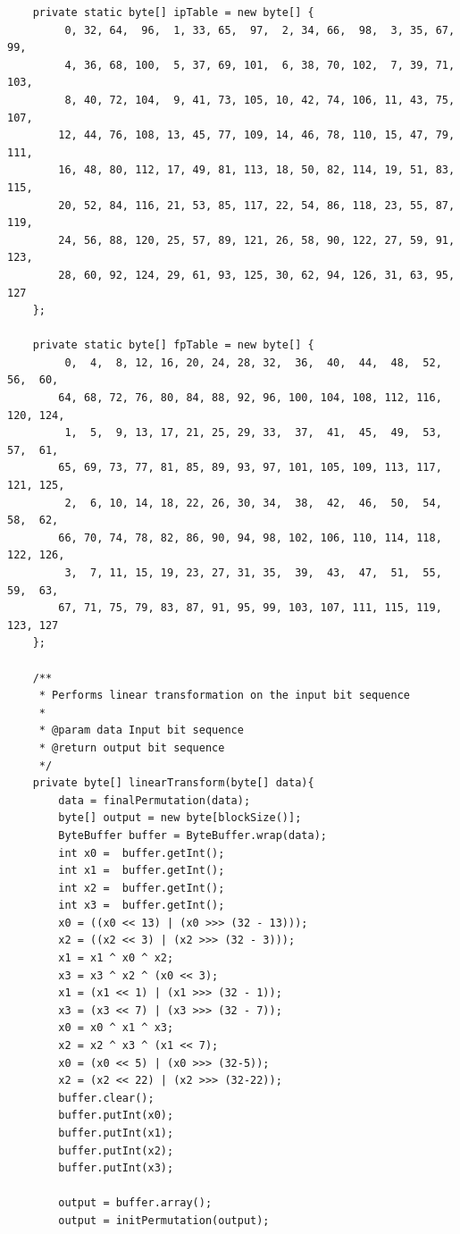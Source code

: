 \documentclass[12pt]{article} %
\begin{document}
\begin{lstlisting}
    private static byte[] ipTable = new byte[] {
         0, 32, 64,  96,  1, 33, 65,  97,  2, 34, 66,  98,  3, 35, 67,  99,
         4, 36, 68, 100,  5, 37, 69, 101,  6, 38, 70, 102,  7, 39, 71, 103,
         8, 40, 72, 104,  9, 41, 73, 105, 10, 42, 74, 106, 11, 43, 75, 107,
        12, 44, 76, 108, 13, 45, 77, 109, 14, 46, 78, 110, 15, 47, 79, 111,
        16, 48, 80, 112, 17, 49, 81, 113, 18, 50, 82, 114, 19, 51, 83, 115,
        20, 52, 84, 116, 21, 53, 85, 117, 22, 54, 86, 118, 23, 55, 87, 119,
        24, 56, 88, 120, 25, 57, 89, 121, 26, 58, 90, 122, 27, 59, 91, 123,
        28, 60, 92, 124, 29, 61, 93, 125, 30, 62, 94, 126, 31, 63, 95, 127
    };

    private static byte[] fpTable = new byte[] {
         0,  4,  8, 12, 16, 20, 24, 28, 32,  36,  40,  44,  48,  52,  56,  60,
        64, 68, 72, 76, 80, 84, 88, 92, 96, 100, 104, 108, 112, 116, 120, 124,
         1,  5,  9, 13, 17, 21, 25, 29, 33,  37,  41,  45,  49,  53,  57,  61,
        65, 69, 73, 77, 81, 85, 89, 93, 97, 101, 105, 109, 113, 117, 121, 125,
         2,  6, 10, 14, 18, 22, 26, 30, 34,  38,  42,  46,  50,  54,  58,  62,
        66, 70, 74, 78, 82, 86, 90, 94, 98, 102, 106, 110, 114, 118, 122, 126,
         3,  7, 11, 15, 19, 23, 27, 31, 35,  39,  43,  47,  51,  55,  59,  63,
        67, 71, 75, 79, 83, 87, 91, 95, 99, 103, 107, 111, 115, 119, 123, 127
    };
    
    /**
     * Performs linear transformation on the input bit sequence
     * 
     * @param data Input bit sequence
     * @return output bit sequence
     */
    private byte[] linearTransform(byte[] data){
        data = finalPermutation(data);
        byte[] output = new byte[blockSize()];
        ByteBuffer buffer = ByteBuffer.wrap(data);
        int x0 =  buffer.getInt();
        int x1 =  buffer.getInt();
        int x2 =  buffer.getInt();
        int x3 =  buffer.getInt();
        x0 = ((x0 << 13) | (x0 >>> (32 - 13))); 
        x2 = ((x2 << 3) | (x2 >>> (32 - 3)));
        x1 = x1 ^ x0 ^ x2;
        x3 = x3 ^ x2 ^ (x0 << 3);
        x1 = (x1 << 1) | (x1 >>> (32 - 1));
        x3 = (x3 << 7) | (x3 >>> (32 - 7));
        x0 = x0 ^ x1 ^ x3;
        x2 = x2 ^ x3 ^ (x1 << 7);
        x0 = (x0 << 5) | (x0 >>> (32-5));
        x2 = (x2 << 22) | (x2 >>> (32-22));
        buffer.clear();
        buffer.putInt(x0);
        buffer.putInt(x1);
        buffer.putInt(x2);
        buffer.putInt(x3);
        
        output = buffer.array();
        output = initPermutation(output);
        

\end{lstlisting}
\end{document}

